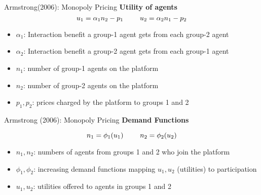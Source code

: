 \documentclass[aspectratio=169]{beamer}  %
\begin{document}
\begin{frame}{Armstrong(2006): Monopoly Pricing}
    \textbf{Utility of agents}
    \vspace{1em}
    \begin{equation}
        \large
        u_{1} = \alpha_{1} n_{2} - p_{1}
            \qquad
        u_{2} = \alpha_{2} n_{1} - p_{2}
    \end{equation}
    \begin{itemize}
      \item $\alpha_{1}$: Interaction benefit a group-1 agent gets from each group-2 agent
      \item $\alpha_{2}$: Interaction benefit a group-2 agent gets from each group-1 agent
      \item $n_{1}$: number of group-1 agents on the platform
      \item $n_{2}$: number of group-2 agents on the platform
      \item $p_{1}, p_{2}$: prices charged by the platform to groups 1 and 2
    \end{itemize}
\end{frame}

\begin{frame}{Armstrong (2006): Monopoly Pricing}
    \textbf{Demand Functions}
    \vspace{1em}
    
    \begin{equation}
        \large
        n_{1} = \phi_{1}(u_{1})
        \qquad
        n_{2} = \phi_{2}(u_{2})
    \end{equation}
    
    \begin{itemize}
      \item $n_{1}, n_{2}$: numbers of agents from groups 1 and 2 
                            who join the platform
      \item $\phi_{1}, \phi_{2}$: increasing demand functions mapping 
                                  $u_{1}, u_{2}$ (utilities) to participation
      \item $u_{1}, u_{2}$: utilities offered to agents in groups 1 and 2
    \end{itemize}
\end{frame}
\end{document}
